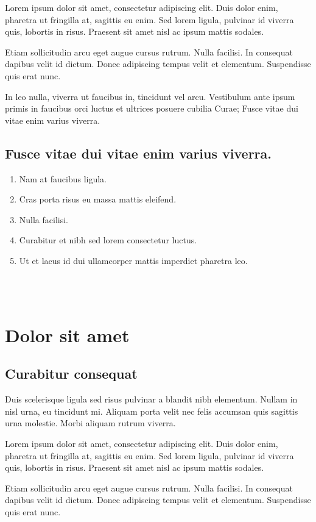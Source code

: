 \documentclass[10pt,landscape]{cheatsheet}
\begin{document}
\begin{multicols}{3}
Lorem ipsum dolor sit
amet, consectetur adipiscing elit. Duis dolor enim, pharetra ut fringilla
at, sagittis eu enim. Sed lorem ligula, pulvinar id viverra quis, lobortis
in risus. Praesent sit amet nisl ac ipsum mattis sodales.

Etiam
sollicitudin arcu eget augue cursus rutrum. Nulla facilisi. In consequat
dapibus velit id dictum. Donec adipiscing tempus velit et elementum.
Suspendisse quis erat nunc.

In leo nulla, viverra ut faucibus in, tincidunt
vel arcu. Vestibulum ante ipsum primis in faucibus orci luctus et ultrices
posuere cubilia Curae; Fusce vitae dui vitae enim varius viverra.

\subsection{Fusce vitae dui vitae enim varius viverra.}
\begin{enumerate}
\item Nam at faucibus ligula.
\item Cras porta risus eu massa mattis eleifend.
\item Nulla facilisi.
\item Curabitur et nibh sed lorem consectetur luctus.
\item Ut et lacus id dui ullamcorper mattis imperdiet pharetra leo.
\end{enumerate}

~\\~\\
\section{Dolor sit amet}
\subsection{Curabitur consequat}
Duis scelerisque ligula sed risus pulvinar a blandit nibh elementum. Nullam
in nisl urna, eu tincidunt mi. Aliquam porta velit nec felis accumsan quis
sagittis urna molestie. Morbi aliquam rutrum viverra.

Lorem ipsum dolor sit
amet, consectetur adipiscing elit. Duis dolor enim, pharetra ut fringilla
at, sagittis eu enim. Sed lorem ligula, pulvinar id viverra quis, lobortis
in risus. Praesent sit amet nisl ac ipsum mattis sodales.

Etiam
sollicitudin arcu eget augue cursus rutrum. Nulla facilisi. In consequat
dapibus velit id dictum. Donec adipiscing tempus velit et elementum.
Suspendisse quis erat nunc.


\end{multicols}
\end{document}
